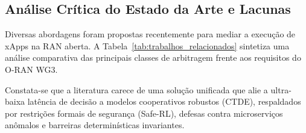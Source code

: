 \documentclass[12pt]{article}
\begin{document}
\subsection{Análise Crítica do Estado da Arte e Lacunas}

Diversas abordagens foram propostas recentemente para mediar a execução de xApps na RAN aberta. A Tabela~\ref{tab:trabalhos_relacionados} sintetiza uma análise comparativa das principais classes de arbitragem frente aos requisitos do O-RAN WG3.

\begin{table}[H]
\centering
\caption{Comparativo analítico de estratégias de mitigação de conflitos em Near-RT RIC.}
\label{tab:trabalhos_relacionados}
\end{table}

Constata-se que a literatura carece de uma solução unificada que alie a ultra-baixa latência de decisão a modelos cooperativos robustos (CTDE), respaldados por restrições formais de segurança (Safe-RL), defesas contra microserviços anômalos e barreiras determinísticas invariantes.

\end{document}
